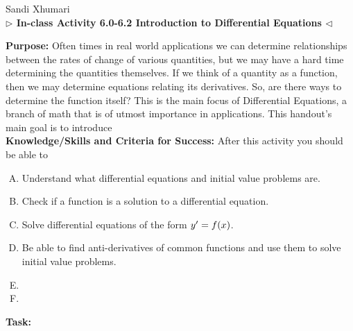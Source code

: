 \documentclass[answers]{exam}
\begin{document}
\begin{center}
 \hfill Sandi Xhumari \\ \textbf{$\triangleright$ In-class Activity 6.0-6.2 Introduction to Differential Equations $\triangleleft$}\\
\end{center}


\textbf{Purpose:} Often times in real world applications we can determine relationships between the rates of change of various quantities, but we may have a hard time determining the quantities themselves. If we think of a quantity as a function, then we may determine equations relating its derivatives. So, are there ways to determine the function itself? This is the main focus of Differential Equations, a branch of math that is of utmost importance in applications. This handout's main goal is to introduce \\





\textbf{Knowledge/Skills and Criteria for Success:} After this activity you should be able to
\begin{enumerate}[A.]
\item Understand what differential equations and initial value problems are.
\item Check if a function is a solution to a differential equation.
\item Solve differential equations of the form $y\rq{} = f(x)$.
\item Be able to find anti-derivatives of common functions and use them to solve initial value problems.
\item 
\item 

\end{enumerate}

\textbf{Task:} 
\end{document}
